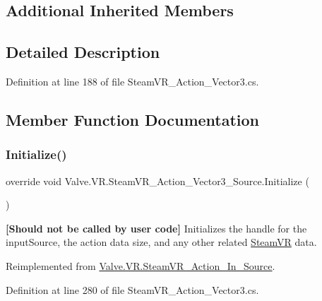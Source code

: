 \subsection*{Additional Inherited Members}


\subsection{Detailed Description}


Definition at line 188 of file Steam\+V\+R\+\_\+\+Action\+\_\+\+Vector3.\+cs.



\subsection{Member Function Documentation}
\mbox{\label{class_valve_1_1_v_r_1_1_steam_v_r___action___vector3___source_a81f16a2652a419128d21fb861cd41112}} 
\subsubsection{\texorpdfstring{Initialize()}{Initialize()}}
{\footnotesize\ttfamily override void Valve.\+V\+R.\+Steam\+V\+R\+\_\+\+Action\+\_\+\+Vector3\+\_\+\+Source.\+Initialize (\begin{DoxyParamCaption}{ }\end{DoxyParamCaption})\hspace{0.3cm}{\ttfamily [virtual]}}



{\bfseries{\mbox{[}Should not be called by user code\mbox{]}}} Initializes the handle for the input\+Source, the action data size, and any other related \mbox{\hyperlink{class_valve_1_1_v_r_1_1_steam_v_r}{Steam\+VR}} data. 



Reimplemented from \mbox{\hyperlink{class_valve_1_1_v_r_1_1_steam_v_r___action___in___source_a15f00851d0666c0f9f1836bf481f4f70}{Valve.\+V\+R.\+Steam\+V\+R\+\_\+\+Action\+\_\+\+In\+\_\+\+Source}}.



Definition at line 280 of file Steam\+V\+R\+\_\+\+Action\+\_\+\+Vector3.\+cs.

